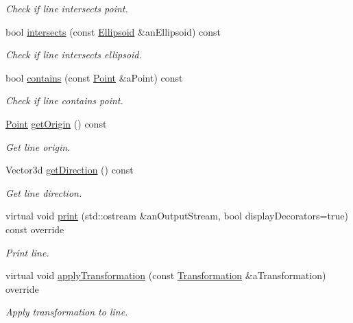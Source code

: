 \begin{DoxyCompactItemize}
\begin{DoxyCompactList}\small\item\em Check if line intersects point. \end{DoxyCompactList}\item 
bool \hyperlink{classlibrary_1_1math_1_1geom_1_1d3_1_1objects_1_1_line_a2cc1edf1b60745c518fbf19f2ab0771c}{intersects} (const \hyperlink{classlibrary_1_1math_1_1geom_1_1d3_1_1objects_1_1_ellipsoid}{Ellipsoid} \&an\+Ellipsoid) const
\begin{DoxyCompactList}\small\item\em Check if line intersects ellipsoid. \end{DoxyCompactList}\item 
bool \hyperlink{classlibrary_1_1math_1_1geom_1_1d3_1_1objects_1_1_line_a59b72a3a39134963f5165a03829b17aa}{contains} (const \hyperlink{classlibrary_1_1math_1_1geom_1_1d3_1_1objects_1_1_point}{Point} \&a\+Point) const
\begin{DoxyCompactList}\small\item\em Check if line contains point. \end{DoxyCompactList}\item 
\hyperlink{classlibrary_1_1math_1_1geom_1_1d3_1_1objects_1_1_point}{Point} \hyperlink{classlibrary_1_1math_1_1geom_1_1d3_1_1objects_1_1_line_ad65178573d705ad21bdd54e7f4b7f104}{get\+Origin} () const
\begin{DoxyCompactList}\small\item\em Get line origin. \end{DoxyCompactList}\item 
Vector3d \hyperlink{classlibrary_1_1math_1_1geom_1_1d3_1_1objects_1_1_line_aa108a53227e4326188fe17a03c55f9cb}{get\+Direction} () const
\begin{DoxyCompactList}\small\item\em Get line direction. \end{DoxyCompactList}\item 
virtual void \hyperlink{classlibrary_1_1math_1_1geom_1_1d3_1_1objects_1_1_line_a6c2d2268fed2b9c461730fbcd4425d6e}{print} (std\+::ostream \&an\+Output\+Stream, bool display\+Decorators=true) const override
\begin{DoxyCompactList}\small\item\em Print line. \end{DoxyCompactList}\item 
virtual void \hyperlink{classlibrary_1_1math_1_1geom_1_1d3_1_1objects_1_1_line_ae485ab541cbd10113eac30d1956fb4c0}{apply\+Transformation} (const \hyperlink{classlibrary_1_1math_1_1geom_1_1d3_1_1_transformation}{Transformation} \&a\+Transformation) override
\begin{DoxyCompactList}\small\item\em Apply transformation to line. \end{DoxyCompactList}\end{DoxyCompactItemize}
